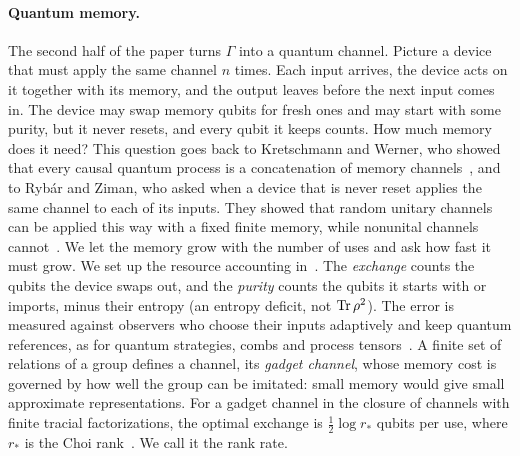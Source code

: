 \paragraph{Quantum memory.} The second half of the paper turns $\Gamma$ into a quantum channel. Picture a device that must apply the same
channel $n$ times. Each input arrives, the device acts on it together with its memory, and the output leaves before the next input comes in.
The device may swap memory qubits for fresh ones and may start with some purity, but it never resets, and every qubit it keeps counts. How much
memory does it need? This question goes back to Kretschmann and Werner, who showed that every causal quantum process is a concatenation of
memory channels~\cite{KretschmannWerner2005}, and to Rybár and Ziman, who asked when a device that is never reset applies the same channel to
each of its inputs. They showed that random unitary channels can be applied this way with a fixed finite memory, while nonunital channels
cannot~\cite{RybarZiman2008}. We let the memory grow with the number of uses and ask how fast it must grow. We set up the resource accounting in~\cite{DouglasMghirbiB}. The \emph{exchange} counts the qubits
the device swaps out, and the \emph{purity} counts the qubits it starts with or imports, minus their entropy (an entropy deficit, not $\operatorname{Tr}\rho^2$). The error is
measured against observers who choose their inputs adaptively and keep quantum references, as for quantum strategies, combs and
process tensors~\cite{GutoskiWatrous2007,Chiribella2009,Pollock2018}. A finite set of relations of a
group defines a channel, its \emph{gadget channel}, whose memory cost is governed by how well the group can be imitated: small memory would
give small approximate representations. For a gadget channel in the closure of channels with finite tracial factorizations, the optimal
exchange is $\frac12\log r_*$ qubits per use, where $r_*$ is the Choi rank~\cite[Propositions~3.1 and~9.1]{DouglasMghirbiB}. We call it the
rank rate.


